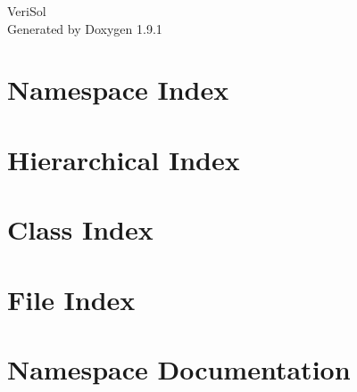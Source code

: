 \let\mypdfximage\pdfximage\def\pdfximage{\immediate\mypdfximage}\documentclass[twoside]{book}
\newcommand{\+}{\discretionary{\mbox{\scriptsize$\hookleftarrow$}}{}{}}
\newcommand{\clearemptydoublepage}{%
  \newpage{\pagestyle{empty}\cleardoublepage}%
}
\begin{document}
\raggedbottom

\hypersetup{pageanchor=false,
             bookmarksnumbered=true,
             pdfencoding=unicode
            }
\begin{titlepage}
\vspace*{7cm}
\begin{center}%
{\Large Veri\+Sol }\\
\vspace*{1cm}
{\large Generated by Doxygen 1.9.1}\\
\end{center}
\end{titlepage}
\clearemptydoublepage
{}
\tableofcontents
\clearemptydoublepage
{}
\hypersetup{pageanchor=true}

\chapter{Namespace Index}

\chapter{Hierarchical Index}

\chapter{Class Index}

\chapter{File Index}

\chapter{Namespace Documentation}







\end{document}
